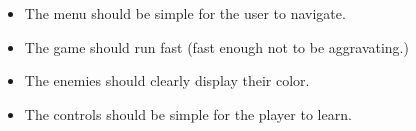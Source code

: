\begin{itemize}
    \item The menu should be simple for the user to navigate.
    \item The game should run fast (fast enough not to be aggravating.)
    \item The enemies should clearly display their color.
    \item The controls should be simple for the player to learn.
\end{itemize}
